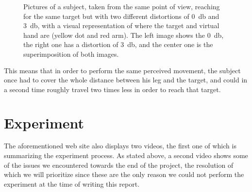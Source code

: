 \begin{figure}[h]
    \caption{Pictures of a subject, taken from the same point of view, reaching for the same target but with two different distortions of \SI{0}{\decibel} and \SI{3}{\decibel}, with a visual representation of where the target and virtual hand are (yellow dot and red arm). The left image shows the \SI{0}{\decibel}, the right one has a distortion of \SI{3}{\decibel}, and the center one is the superimposition of both images.}
    \label{fig:realMocapDistortion}
\end{figure}

This means that in order to perform the same perceived movement, the subject once had to cover the whole distance between his leg and the target, and could in a second time roughly travel two times less in order to reach that target.

\section{Experiment}

The aforementioned web site also displays two videos, the first one of which is summarizing the experiment process. As stated above, a second video shows some of the issues we encountered towards the end of the project, the resolution of which we will prioritize since these are the only reason we could not perform the experiment at the time of writing this report.